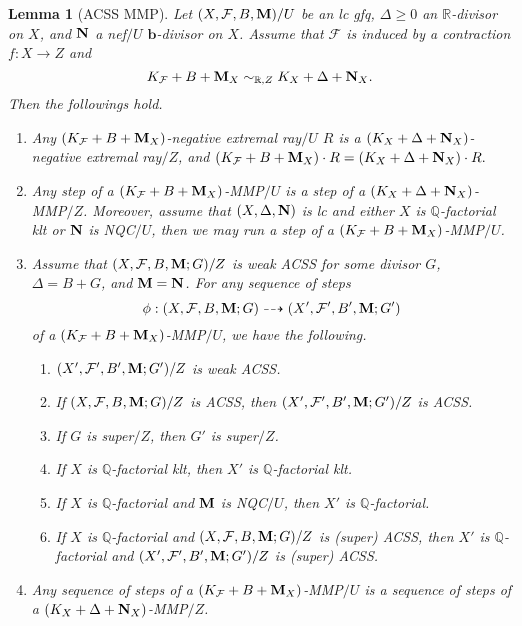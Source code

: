 \documentclass[11pt]{amsart}
\numberwithin{equation}{section}
\newcommand{\bb}{\bm{b}}
\newcommand{\Mm}{{\bf{M}}}
\newcommand{\Nn}{{\bf{N}}}
\newcommand{\Qq}{\mathbb{Q}}
\newcommand{\Rr}{\mathbb{R}}
\newcommand{\Ff}{\mathcal{F}}
\newtheorem{lem}[thm]{Lemma}
\theoremstyle{definition}
\theoremstyle{definition}
\theoremstyle{definition}
\begin{document}
\begin{lem}[ACSS MMP]\label{lem: ACSS mmp can run}
Let $(X,\Ff,B,\Mm)/U$ be an lc gfq, $\Delta\geq 0$ an $\Rr$-divisor on $X$, and $\Nn$ a nef$/U$ $\bb$-divisor on $X$. Assume that $\Ff$ is induced by a contraction $f: X\rightarrow Z$ and 
$$K_{\Ff}+B+\Mm_X\sim_{\mathbb R,Z}K_X+\Delta+\Nn_X.$$
 Then the followings hold.
\begin{enumerate}
    \item Any $(K_{\Ff}+B+\Mm_X)$-negative extremal ray$/U$ $R$ is a $(K_X+\Delta+\Nn_X)$-negative extremal ray$/Z$, and $(K_{\Ff}+B+\Mm_X)\cdot R=(K_X+\Delta+\Nn_X)\cdot R.$
    \item Any step of a $(K_{\Ff}+B+\Mm_X)$-MMP$/U$ is a step of a $(K_X+\Delta+\Nn_X)$-MMP$/Z$. Moreover, assume that $(X,\Delta,\Nn)$ is lc and either $X$ is $\Qq$-factorial klt or $\Nn$ is NQC$/U$, then we may run a step of a $(K_{\Ff}+B+\Mm_X)$-MMP$/U$.
    \item Assume that $(X,\Ff,B,\Mm;G)/Z$ is weak ACSS for some divisor $G$, $\Delta=B+G$, and $\Mm=\Nn$. For any sequence of steps $$\phi: (X,\Ff,B,\Mm;G)\dashrightarrow (X',\Ff',B',\Mm;G')$$ 
    of a $(K_{\Ff}+B+\Mm_X)$-MMP$/U$, we have the following.
    \begin{enumerate}
    \item $(X',\Ff',B',\Mm;G')/Z$ is weak ACSS.
        \item If $(X,\Ff,B,\Mm;G)/Z$ is ACSS, then $(X',\Ff',B',\Mm;G')/Z$ is ACSS. 
        \item If $G$ is super$/Z$, then $G'$ is super$/Z$.
        \item If $X$ is $\Qq$-factorial klt, then $X'$ is $\Qq$-factorial klt. 
        \item If $X$ is $\Qq$-factorial and $\Mm$ is NQC$/U$, then $X'$ is $\Qq$-factorial.
        \item If $X$ is $\Qq$-factorial and $(X,\Ff,B,\Mm;G)/Z$ is (super) ACSS, then $X'$ is $\Qq$-factorial and $(X',\Ff',B',\Mm;G')/Z$ is (super) ACSS.
    \end{enumerate}
    \item Any sequence of steps of a $(K_{\Ff}+B+\Mm_X)$-MMP$/U$ is a sequence of steps of a $(K_X+\Delta+\Nn_X)$-MMP$/Z$.
\end{enumerate}
\end{lem}
\end{document}
